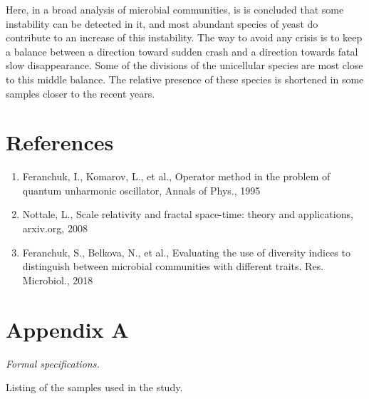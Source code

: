 \documentclass[a4paper]{article}
\begin{document}
Here, in a broad analysis of microbial communities, is is concluded that some instability can be detected in it, and most abundant species of yeast do contribute to an increase of this instability. The way to avoid any crisis is to keep a balance between a direction toward sudden crash and a direction towards fatal slow disappearance. Some of the divisions of the unicellular species are most close to this middle balance. The relative presence of these species is shortened in some samples closer to the recent years.




\section*{References}

\begin{enumerate}

\item Feranchuk, I., Komarov, L., et al., Operator method in the problem of quantum unharmonic oscillator, Annals of Phys., 1995 

\item Nottale, L., Scale relativity and fractal space-time: theory and applications, arxiv.org, 2008

\item Feranchuk, S., Belkova, N., et al., Evaluating the use of diversity indices to distinguish between microbial communities with different traits. Res. Microbiol., 2018

\end{enumerate}

\newpage
\section*{Appendix A}

\textit{Formal specifications.}

\vskip 5pt

Listing of the samples used in the study.

\vskip 5pt
\end{document}
